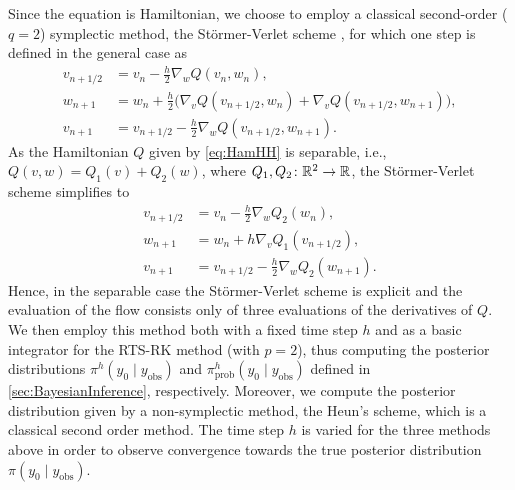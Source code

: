 \documentclass[10pt]{article}
\begin{document}
Since the equation is Hamiltonian, we choose to employ a classical second-order ($q = 2$) symplectic method, the Störmer-Verlet scheme \cite{Sto07, Ver67, HLW06}, for which one step is defined in the general case as
\begin{equation}
\begin{aligned}
v_{n+1/2} &= v_n - \frac{h}{2} \nabla_w Q(v_n, w_n), \\
w_{n+1} &= w_n + \frac{h}{2} \big(\nabla_v Q(v_{n+1/2}, w_n) + \nabla_v Q(v_{n+1/2}, w_{n+1})\big),\\
v_{n+1} &= v_{n+1/2} - \frac{h}{2} \nabla_w Q(v_{n+1/2}, w_{n+1}).
\end{aligned}
\end{equation}
As the Hamiltonian $Q$ given by \eqref{eq:HamHH} is separable, i.e., $Q(v, w) = Q_1(v) + Q_2(w)$, where $Q_1, Q_2 \colon \mathbb{R}^2 \to \mathbb{R}$, the Störmer-Verlet scheme simplifies to
\begin{equation}
\begin{aligned}
v_{n+1/2} &= v_n - \frac{h}{2} \nabla_w Q_2(w_n), \\
w_{n+1} &= w_n + h \nabla_v Q_1(v_{n+1/2}),\\
v_{n+1} &= v_{n+1/2} - \frac{h}{2} \nabla_w Q_2(w_{n+1}).
\end{aligned}
\end{equation}
Hence, in the separable case the Störmer-Verlet scheme is explicit and the evaluation of the flow consists only of three evaluations of the derivatives of $Q$. We then employ this method both with a fixed time step $h$ and as a basic integrator for the RTS-RK method (with $p = 2$), thus computing the posterior distributions $\pi^h(y_0 \mid y_{\mathrm{obs}})$ and $\pi^h_{\mathrm{prob}}(y_0 \mid y_{\mathrm{obs}})$ defined in \cref{sec:BayesianInference}, respectively. Moreover, we compute the posterior distribution given by a non-symplectic method, the Heun's scheme, which is a classical second order method. The time step $h$ is varied for the three methods above in order to observe convergence towards the true posterior distribution $\pi(y_0 \mid y_{\mathrm{obs}})$.
\end{document}
